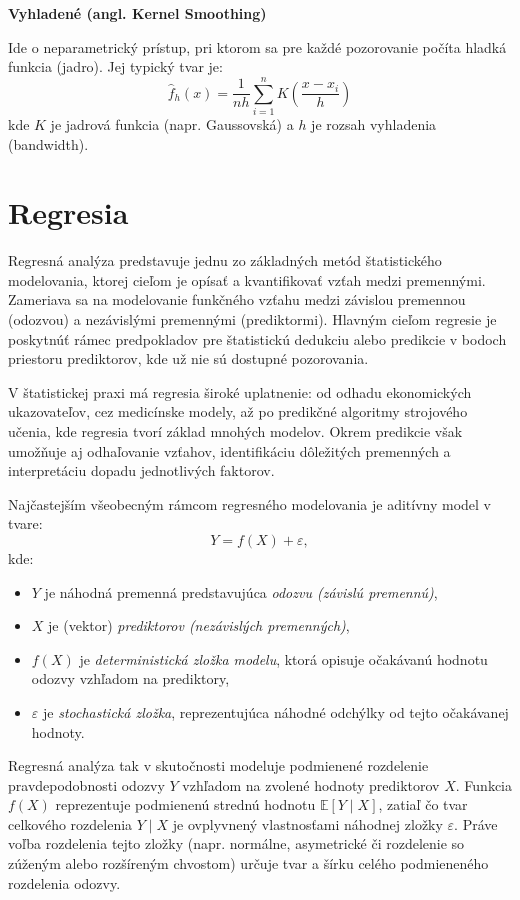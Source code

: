 \textbf{Vyhladené (angl. Kernel Smoothing)}\label{textbf:kernel_smoothing}

Ide o neparametrický prístup, pri ktorom sa pre každé pozorovanie počíta hladká funkcia (jadro). Jej typický tvar je:
\begin{equation}
\hat{f}_{h}(x) = \frac{1}{nh} \sum_{i=1}^n K\left( \frac{x - x_i}{h} \right)
\end{equation}
kde $K$ je jadrová funkcia (napr. Gaussovská) a $h$ je rozsah vyhladenia (bandwidth).

\section{Regresia}\label{sec:regresia}

Regresná analýza predstavuje jednu zo základných metód štatistického modelovania, ktorej cieľom je opísať a kvantifikovať vzťah medzi premennými. Zameriava sa na modelovanie funkčného vzťahu medzi závislou premennou (odozvou) a nezávislými premennými (prediktormi). Hlavným cieľom regresie je poskytnúť rámec predpokladov pre štatistickú dedukciu alebo  predikcie v bodoch priestoru prediktorov, kde už nie sú dostupné pozorovania.

V štatistickej praxi má regresia široké uplatnenie: od odhadu ekonomických ukazovateľov, cez medicínske modely, až po predikčné algoritmy strojového učenia, kde regresia tvorí základ mnohých modelov. Okrem predikcie však umožňuje aj odhaľovanie vzťahov, identifikáciu dôležitých premenných a interpretáciu dopadu jednotlivých faktorov.

Najčastejším všeobecným rámcom regresného modelovania je aditívny model v tvare:
\begin{equation}
Y = f(X) + \varepsilon,
\end{equation}
kde:
\begin{itemize}
  \item $Y$ je náhodná premenná predstavujúca \textit{odozvu (závislú premennú)},
  \item $X$ je (vektor) \textit{prediktorov (nezávislých premenných)},
  \item $f(X)$ je \textit{deterministická zložka modelu}, ktorá opisuje očakávanú hodnotu odozvy vzhľadom na prediktory,
  \item $\varepsilon$ je \textit{stochastická zložka}, reprezentujúca náhodné odchýlky od tejto očakávanej hodnoty.
\end{itemize}

Regresná analýza tak v skutočnosti modeluje podmienené rozdelenie pravdepodobnosti odozvy $Y$ vzhľadom na zvolené hodnoty prediktorov $X$. Funkcia $f(X)$ reprezentuje podmienenú strednú hodnotu $\mathbb{E}[Y \mid X]$, zatiaľ čo tvar celkového rozdelenia $Y \mid X$ je ovplyvnený vlastnosťami náhodnej zložky $\varepsilon$. Práve voľba rozdelenia tejto zložky (napr. normálne, asymetrické či rozdelenie so zúženým alebo rozšíreným chvostom) určuje tvar a šírku celého podmieneného rozdelenia odozvy.

